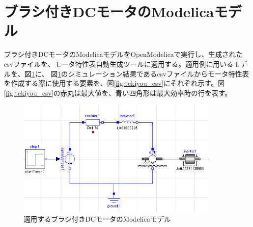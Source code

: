 \section{ブラシ付きDCモータのModelicaモデル}
ブラシ付きDCモータのModelicaモデルをOpenModelicaで実行し、生成されたcsvファイルを、モータ特性表自動生成ツールに適用する。適用例に用いるモデルを、図\ref{fig:tekiyou_tanntai}に、
図\ref{fig:tekiyou_tanntai}のシミュレーション結果であるcsvファイルからモータ特性表を作成する際に使用する要素を、図\ref{fig:tekiyou_csv}にそれぞれ示す。図\ref{fig:tekiyou_csv}の赤丸は最大値を、青い四角形は最大効率時の行を表す。
\begin{figure}[t]
	\centering
	\includegraphics[width=10cm]{./Image/tekiyou_tanntai.png}
	\caption{適用するブラシ付きDCモータのModelicaモデル}
	\label{fig:tekiyou_tanntai}
\end{figure}
